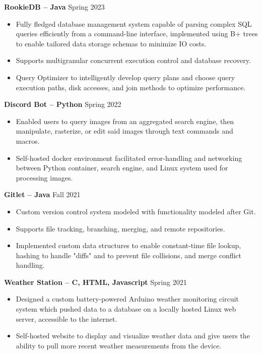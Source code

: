 \documentclass{article}
\begin{document}
    



    \begin{adjustwidth}{1em}{1em}
        \textbf{RookieDB -- Java} \hfill Spring 2023
        \begin{itemize}
            \item Fully fledged database management system capable of parsing complex SQL queries efficiently from a command-line interface, implemented using B+ trees to enable tailored data storage schemas to minimize IO costs.
            \item Supports multigranular concurrent execution control and database recovery.
            \item Query Optimizer to intelligently develop query plans and choose query execution paths, disk accesses, and join methods to optimize performance.
        \end{itemize}

        \vspace{1mm}

        \textbf{Discord Bot -- Python} \hfill Spring 2022
        \begin{itemize}
            \item Enabled users to query images from an aggregated search engine, then manipulate, rasterize, or edit said images through text commands and macros.
            \item Self-hosted docker environment facilitated error-handling and networking between Python container, search engine, and Linux system used for processing images.
        \end{itemize}

        \textbf{Gitlet -- Java} \hfill Fall 2021 
        \begin{itemize}
            \item Custom version control system modeled with functionality modeled after Git.
            \item Supports file tracking, branching, merging, and remote repositories.
            \item Implemented custom data structures to enable constant-time file lookup, hashing to handle "diffs" and to prevent file collisions, and merge conflict handling.
        \end{itemize}

        \vspace{1mm}

        \noindent \textbf{Weather Station -- C, HTML, Javascript} \hfill Spring 2021
        \begin{itemize}
            \item Designed a custom battery-powered Arduino weather monitoring circuit system which pushed data to a database on a locally hosted Linux web server, accessible to the internet. 
            \item Self-hosted website to display and visualize weather data and give users the ability to pull more recent weather measurements from the device.
        \end{itemize}

        
    \end{adjustwidth}
\end{document}
